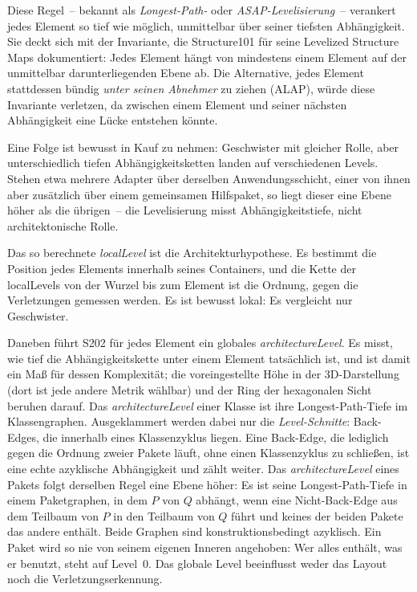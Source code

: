 \documentclass[a4paper,11pt]{article}
\begin{document}
Diese Regel~-- bekannt als \emph{Longest-Path-} oder \emph{ASAP-Levelisierung}~--
verankert jedes Element so tief wie m\"oglich, unmittelbar \"uber seiner tiefsten
Abh\"angigkeit. Sie deckt sich mit der Invariante, die Structure101 f\"ur seine
Levelized Structure Maps dokumentiert: Jedes Element h\"angt von mindestens einem
Element auf der unmittelbar darunterliegenden Ebene ab. Die Alternative, jedes
Element stattdessen b\"undig \emph{unter seinen Abnehmer} zu ziehen (ALAP), w\"urde
diese Invariante verletzen, da zwischen einem Element und seiner n\"achsten
Abh\"angigkeit eine L\"ucke entstehen k\"onnte.

Eine Folge ist bewusst in Kauf zu nehmen: Geschwister mit gleicher Rolle, aber
unterschiedlich tiefen Abh\"angigkeitsketten landen auf verschiedenen Levels.
Stehen etwa mehrere Adapter \"uber derselben Anwendungsschicht, einer von ihnen
aber zus\"atzlich \"uber einem gemeinsamen Hilfspaket, so liegt dieser eine Ebene
h\"oher als die \"ubrigen~-- die Levelisierung misst Abh\"angigkeitstiefe, nicht
architektonische Rolle.

Das so berechnete \emph{localLevel} ist die Architekturhypothese. Es
bestimmt die Position jedes Elements innerhalb seines Containers, und die
Kette der localLevels von der Wurzel bis zum Element ist die Ordnung, gegen
die Verletzungen gemessen werden. Es ist bewusst lokal: Es vergleicht nur
Geschwister.

Daneben f\"uhrt S202 f\"ur jedes Element ein globales \emph{architectureLevel}.
Es misst, wie tief die Abh\"angigkeitskette unter einem Element tats\"achlich
ist, und ist damit ein Ma\ss{} f\"ur dessen Komplexit\"at; die voreingestellte
H\"ohe in der 3D-Darstellung (dort ist jede andere Metrik w\"ahlbar) und der
Ring der hexagonalen Sicht beruhen darauf. Das
\emph{architectureLevel} einer Klasse ist ihre Longest-Path-Tiefe im
Klassengraphen. Ausgeklammert werden dabei nur die \emph{Level-Schnitte}:
Back-Edges, die innerhalb eines Klassenzyklus liegen. Eine Back-Edge, die
lediglich gegen die Ordnung zweier Pakete l\"auft, ohne einen Klassenzyklus zu
schlie\ss{}en, ist eine echte azyklische Abh\"angigkeit und z\"ahlt weiter. Das
\emph{architectureLevel} eines Pakets folgt derselben Regel eine Ebene h\"oher:
Es ist seine Longest-Path-Tiefe in einem Paketgraphen, in dem $P$ von $Q$
abh\"angt, wenn eine Nicht-Back-Edge aus dem Teilbaum von $P$ in den Teilbaum
von $Q$ f\"uhrt und keines der beiden Pakete das andere enth\"alt. Beide Graphen
sind konstruktionsbedingt azyklisch. Ein Paket wird so nie von seinem eigenen
Inneren angehoben: Wer alles enth\"alt, was er benutzt, steht auf Level~0. Das
globale Level beeinflusst weder das Layout noch die Verletzungserkennung.
\end{document}

